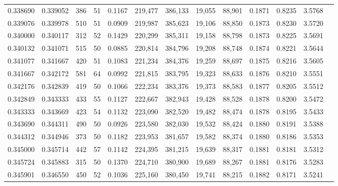 \begin{tabular}{rrrrrrrrrrrrr}
0.338690 & 0.339052 &    386 &    51 &                                     0.1167 & 219,477 & 386,133 &  19,055 &  88,901 & 0.1871 & 0.8235 & 3.5768 \\
0.339076 & 0.339978 &    510 &    51 &                                     0.0909 & 219,987 & 385,623 &  19,106 &  88,850 & 0.1873 & 0.8230 & 3.5720 \\
0.340000 & 0.340117 &    312 &    52 &                                     0.1429 & 220,299 & 385,311 &  19,158 &  88,798 & 0.1873 & 0.8225 & 3.5691 \\
0.340132 & 0.341071 &    515 &    50 &                                     0.0885 & 220,814 & 384,796 &  19,208 &  88,748 & 0.1874 & 0.8221 & 3.5644 \\
0.341077 & 0.341667 &    420 &    51 &                                     0.1083 & 221,234 & 384,376 &  19,259 &  88,697 & 0.1875 & 0.8216 & 3.5605 \\
0.341667 & 0.342172 &    581 &    64 &                                     0.0992 & 221,815 & 383,795 &  19,323 &  88,633 & 0.1876 & 0.8210 & 3.5551 \\
0.342176 & 0.342839 &    419 &    50 &                                     0.1066 & 222,234 & 383,376 &  19,373 &  88,583 & 0.1877 & 0.8205 & 3.5512 \\
0.342849 & 0.343333 &    433 &    55 &                                     0.1127 & 222,667 & 382,943 &  19,428 &  88,528 & 0.1878 & 0.8200 & 3.5472 \\
0.343333 & 0.343669 &    423 &    54 &                                     0.1132 & 223,090 & 382,520 &  19,482 &  88,474 & 0.1878 & 0.8195 & 3.5433 \\
0.343690 & 0.344311 &    490 &    50 &                                     0.0926 & 223,580 & 382,030 &  19,532 &  88,424 & 0.1880 & 0.8191 & 3.5388 \\
0.344312 & 0.344946 &    373 &    50 &                                     0.1182 & 223,953 & 381,657 &  19,582 &  88,374 & 0.1880 & 0.8186 & 3.5353 \\
0.345000 & 0.345714 &    442 &    57 &                                     0.1142 & 224,395 & 381,215 &  19,639 &  88,317 & 0.1881 & 0.8181 & 3.5312 \\
0.345724 & 0.345883 &    315 &    50 &                                     0.1370 & 224,710 & 380,900 &  19,689 &  88,267 & 0.1881 & 0.8176 & 3.5283 \\
0.345901 & 0.346550 &    450 &    52 &                                     0.1036 & 225,160 & 380,450 &  19,741 &  88,215 & 0.1882 & 0.8171 & 3.5241 \\

\end{tabular}
